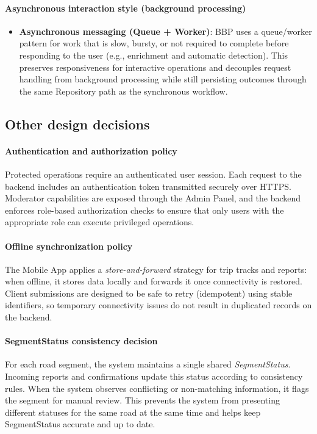 \paragraph{Asynchronous interaction style (background processing)}
\begin{itemize}
	\item \textbf{Asynchronous messaging (Queue + Worker)}: BBP uses a queue/worker pattern for work that is slow, bursty, or not required to complete before responding to the user (e.g., enrichment and automatic detection). This preserves responsiveness for interactive operations and decouples request handling from background processing while still persisting outcomes through the same Repository path as the synchronous workflow.
\end{itemize}

\subsection{Other design decisions}

\paragraph{Authentication and authorization policy}
Protected operations require an authenticated user session. Each request to the backend includes an authentication token transmitted securely over HTTPS. Moderator capabilities are exposed through the Admin Panel, and the backend enforces role-based authorization checks to ensure that only users with the appropriate role can execute privileged operations.

\paragraph{Offline synchronization policy}
The Mobile App applies a \emph{store-and-forward} strategy for trip tracks and reports: when offline, it stores data locally and forwards it once connectivity is restored. Client submissions are designed to be safe to retry (idempotent) using stable identifiers, so temporary connectivity issues do not result in duplicated records on the backend.

\paragraph{SegmentStatus consistency decision}
For each road segment, the system maintains a single shared \emph{SegmentStatus}. Incoming reports and confirmations update this status according to consistency rules. When the system observes conflicting or non-matching information, it flags the segment for manual review. This prevents the system from presenting different statuses for the same road at the same time and helps keep SegmentStatus accurate and up to date.

